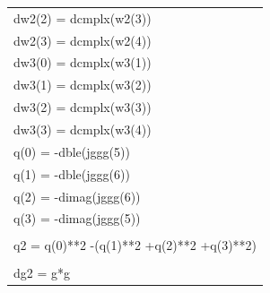 \documentclass[a4paper,11pt]{article}
\begin{document}
\begin{center}
{\begin{supertabular}{l}
      \hspace{0.5em} dw2(2) = dcmplx(w2(3))\\
      \hspace{0.5em} dw2(3) = dcmplx(w2(4))\\
      \hspace{0.5em} dw3(0) = dcmplx(w3(1))\\
      \hspace{0.5em} dw3(1) = dcmplx(w3(2))\\
      \hspace{0.5em} dw3(2) = dcmplx(w3(3))\\
      \hspace{0.5em} dw3(3) = dcmplx(w3(4))\\
      \hspace{0.5em} q(0) = -dble(jggg(5))\\
      \hspace{0.5em} q(1) = -dble(jggg(6))\\
      \hspace{0.5em} q(2) = -dimag(jggg(6))\\
      \hspace{0.5em} q(3) = -dimag(jggg(5))\\
\\
      \hspace{0.5em} q2 = q(0)**2 -(q(1)**2 +q(2)**2 +q(3)**2)\\
\\
      \hspace{0.5em} dg2 = g*g\\


\end{supertabular}}
\end{center}
\end{document}
